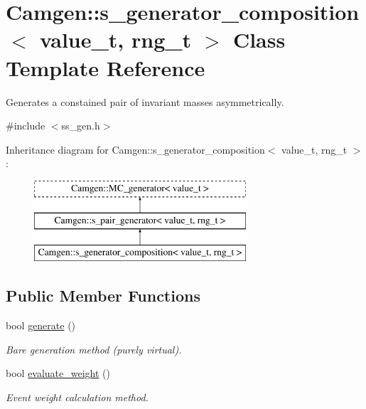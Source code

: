 \hypertarget{a00493}{}\section{Camgen\+:\+:s\+\_\+generator\+\_\+composition$<$ value\+\_\+t, rng\+\_\+t $>$ Class Template Reference}
\label{a00493}


Generates a constained pair of invariant masses asymmetrically.  




{\ttfamily \#include $<$ss\+\_\+gen.\+h$>$}

Inheritance diagram for Camgen\+:\+:s\+\_\+generator\+\_\+composition$<$ value\+\_\+t, rng\+\_\+t $>$\+:\begin{figure}[H]
\begin{center}
\leavevmode
\includegraphics[height=3.000000cm]{a00493}
\end{center}
\end{figure}
\subsection*{Public Member Functions}
\begin{DoxyCompactItemize}
\item 
bool \hyperlink{a00493_afac746267d9514f8dc7d039f64521fd6}{generate} ()
\begin{DoxyCompactList}\small\item\em \textquotesingle{}Bare generation\textquotesingle{} method (purely virtual). \end{DoxyCompactList}\item 
\hypertarget{a00493_acafeb4de1151dd5c2f4ac441ff5a8756}{}bool \hyperlink{a00493_acafeb4de1151dd5c2f4ac441ff5a8756}{evaluate\+\_\+weight} ()\label{a00493_acafeb4de1151dd5c2f4ac441ff5a8756}

\begin{DoxyCompactList}\small\item\em Event weight calculation method. \end{DoxyCompactList}\end{DoxyCompactItemize}
